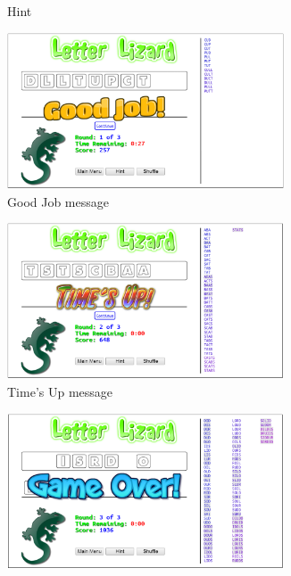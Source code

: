 \begin{figure}
\begin{subfigure}{0.49\textwidth}
        \caption{Hint}
        \label{lljshint}
    \end{subfigure}
    \begin{subfigure}{0.49\textwidth}
        \includegraphics[width=0.9\textwidth]{../screenshots/LetterLizardJS-GoodJob3.png}
        \caption{Good Job message}
        \label{lljsgoodjob}
    \end{subfigure}
    \begin{subfigure}{0.49\textwidth}
        \includegraphics[width=0.9\textwidth]{../screenshots/LetterLizardJS-TimesUp.png}
        \caption{Time's Up message}
        \label{lljstimeup}
    \end{subfigure}
    \begin{subfigure}{0.49\textwidth}
        \includegraphics[width=0.9\textwidth]{../screenshots/LetterLizardJS-GameOver2.png}

\end{subfigure}
\end{figure}
